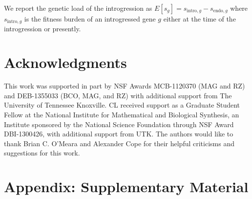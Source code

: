 We report the genetic load of the introgression as $E[s_g] = s_{\text{intro},g} - s_{\text{endo},g}$ where $s_{\text{intro},g}$ is the fitness burden of an introgressed gene $g$ either at the time of the introgression or presently.

\section{Acknowledgments}

This work was supported in part by NSF Awards MCB-1120370 (MAG and RZ) and DEB-1355033 (BCO, MAG, and RZ) with additional support from The University of Tennessee Knoxville. 
CL received support as a Graduate Student Fellow at the National Institute for Mathematical and Biological Synthesis, an Institute sponsored by the National Science Foundation through NSF Award DBI-1300426, with additional support from UTK. 
The authors would like to thank Brian C. O'Meara and Alexander Cope for their helpful criticisms and suggestions for this work.


%
%

\clearpage
\pagebreak
\section{Appendix: Supplementary Material}


